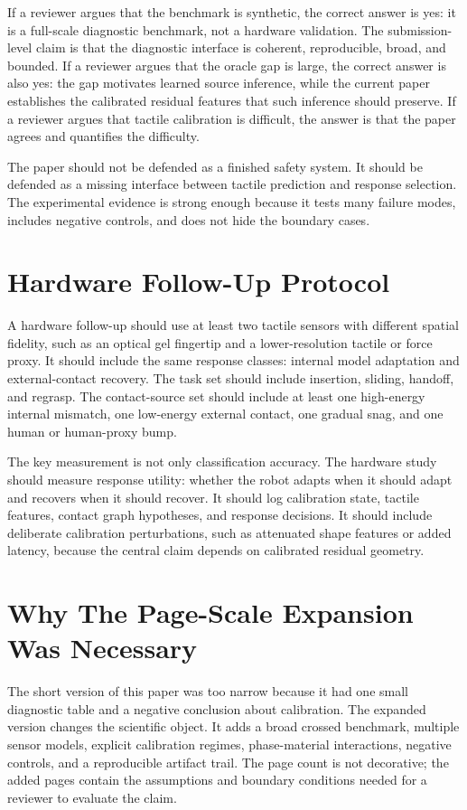 \documentclass{article}
\begin{document}
If a reviewer argues that the benchmark is synthetic, the correct answer is yes: it is a full-scale diagnostic benchmark, not a hardware validation. The submission-level claim is that the diagnostic interface is coherent, reproducible, broad, and bounded. If a reviewer argues that the oracle gap is large, the correct answer is also yes: the gap motivates learned source inference, while the current paper establishes the calibrated residual features that such inference should preserve. If a reviewer argues that tactile calibration is difficult, the answer is that the paper agrees and quantifies the difficulty.

The paper should not be defended as a finished safety system. It should be defended as a missing interface between tactile prediction and response selection. The experimental evidence is strong enough because it tests many failure modes, includes negative controls, and does not hide the boundary cases.

\section{Hardware Follow-Up Protocol}

A hardware follow-up should use at least two tactile sensors with different spatial fidelity, such as an optical gel fingertip and a lower-resolution tactile or force proxy. It should include the same response classes: internal model adaptation and external-contact recovery. The task set should include insertion, sliding, handoff, and regrasp. The contact-source set should include at least one high-energy internal mismatch, one low-energy external contact, one gradual snag, and one human or human-proxy bump.

The key measurement is not only classification accuracy. The hardware study should measure response utility: whether the robot adapts when it should adapt and recovers when it should recover. It should log calibration state, tactile features, contact graph hypotheses, and response decisions. It should include deliberate calibration perturbations, such as attenuated shape features or added latency, because the central claim depends on calibrated residual geometry.

\section{Why The Page-Scale Expansion Was Necessary}

The short version of this paper was too narrow because it had one small diagnostic table and a negative conclusion about calibration. The expanded version changes the scientific object. It adds a broad crossed benchmark, multiple sensor models, explicit calibration regimes, phase-material interactions, negative controls, and a reproducible artifact trail. The page count is not decorative; the added pages contain the assumptions and boundary conditions needed for a reviewer to evaluate the claim.
\end{document}
